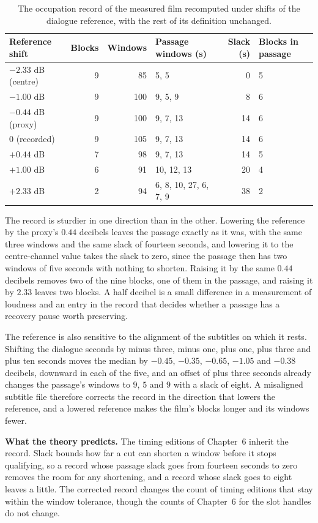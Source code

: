 \documentclass[11pt,twoside,openright]{book}
\theoremstyle{plain}
\theoremstyle{definition}
\theoremstyle{remark}
\begin{document}
\begin{table}[ht]
\centering
\begin{tabular}{@{}lrrp{2.5cm}rp{1.4cm}@{}}
\toprule
Reference shift & Blocks & Windows & Passage windows (s) & Slack (s) & Blocks in passage\\
\midrule
$-2.33$ dB (centre) & 9 & 85 & 5, 5 & 0 & 5\\
$-1.00$ dB & 9 & 100 & 9, 5, 9 & 8 & 6\\
$-0.44$ dB (proxy) & 9 & 100 & 9, 7, 13 & 14 & 6\\
$0$ (recorded) & 9 & 105 & 9, 7, 13 & 14 & 6\\
$+0.44$ dB & 7 & 98 & 9, 7, 13 & 14 & 5\\
$+1.00$ dB & 6 & 91 & 10, 12, 13 & 20 & 4\\
$+2.33$ dB & 2 & 94 & 6, 8, 10, 27, 6, 7, 9 & 38 & 2\\
\bottomrule
\end{tabular}
\caption{The occupation record of the measured film recomputed under shifts of the dialogue reference, with the rest of its definition unchanged.}\label{tab:ref17}
\end{table}

The record is sturdier in one direction than in the other. Lowering the reference by the proxy's $0.44$ decibels leaves the passage exactly as it was, with the same three windows and the same slack of fourteen seconds, and lowering it to the centre-channel value takes the slack to zero, since the passage then has two windows of five seconds with nothing to shorten. Raising it by the same $0.44$ decibels removes two of the nine blocks, one of them in the passage, and raising it by $2.33$ leaves two blocks. A half decibel is a small difference in a measurement of loudness and an entry in the record that decides whether a passage has a recovery pause worth preserving.

The reference is also sensitive to the alignment of the subtitles on which it rests. Shifting the dialogue seconds by minus three, minus one, plus one, plus three and plus ten seconds moves the median by $-0.45$, $-0.35$, $-0.65$, $-1.05$ and $-0.38$ decibels, downward in each of the five, and an offset of plus three seconds already changes the passage's windows to $9$, $5$ and $9$ with a slack of eight. A misaligned subtitle file therefore corrects the record in the direction that lowers the reference, and a lowered reference makes the film's blocks longer and its windows fewer.

\textbf{What the theory predicts.} The timing editions of Chapter~6 inherit the record. Slack bounds how far a cut can shorten a window before it stops qualifying, so a record whose passage slack goes from fourteen seconds to zero removes the room for any shortening, and a record whose slack goes to eight leaves a little. The corrected record changes the count of timing editions that stay within the window tolerance, though the counts of Chapter~6 for the slot handles do not change.
\end{document}
